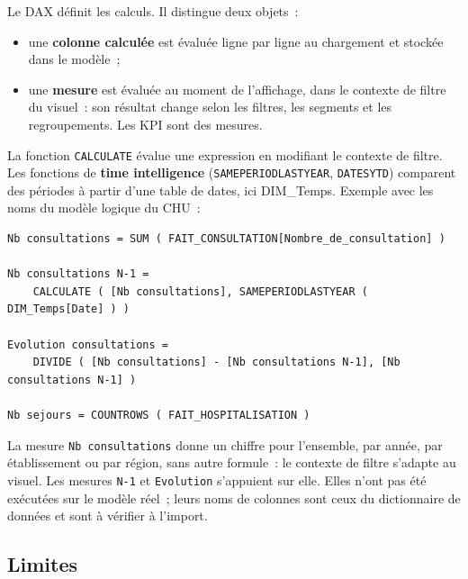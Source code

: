 \noindent Le DAX définit les calculs. Il distingue deux objets~:
\begin{itemize}
	\item une \textbf{colonne calculée} est évaluée ligne par ligne au chargement et stockée dans le modèle~;
	\item une \textbf{mesure} est évaluée au moment de l'affichage, dans le contexte de filtre du visuel~: son résultat change selon les filtres, les segments et les regroupements. Les KPI sont des mesures.
\end{itemize}

\noindent La fonction \texttt{CALCULATE} évalue une expression en modifiant le contexte de filtre. Les fonctions de \textbf{time intelligence} (\texttt{SAMEPERIODLASTYEAR}, \texttt{DATESYTD}) comparent des périodes à partir d'une table de dates, ici DIM\_Temps. Exemple avec les noms du modèle logique du CHU~:

\begin{center}
\begin{minipage}{0.92\textwidth}
\begin{tcolorbox}[colback=title2!6,colframe=title1,boxsep=2pt]
\begin{verbatim}
Nb consultations = SUM ( FAIT_CONSULTATION[Nombre_de_consultation] )

Nb consultations N-1 =
    CALCULATE ( [Nb consultations], SAMEPERIODLASTYEAR ( DIM_Temps[Date] ) )

Evolution consultations =
    DIVIDE ( [Nb consultations] - [Nb consultations N-1], [Nb consultations N-1] )

Nb sejours = COUNTROWS ( FAIT_HOSPITALISATION )
\end{verbatim}
\end{tcolorbox}
\end{minipage}
\end{center}

\noindent La mesure \texttt{Nb consultations} donne un chiffre pour l'ensemble, par année, par établissement ou par région, sans autre formule~: le contexte de filtre s'adapte au visuel. Les mesures \texttt{N-1} et \texttt{Evolution} s'appuient sur elle. Elles n'ont pas été exécutées sur le modèle réel~; leurs noms de colonnes sont ceux du dictionnaire de données et sont à vérifier à l'import.

\subsection{Limites}

